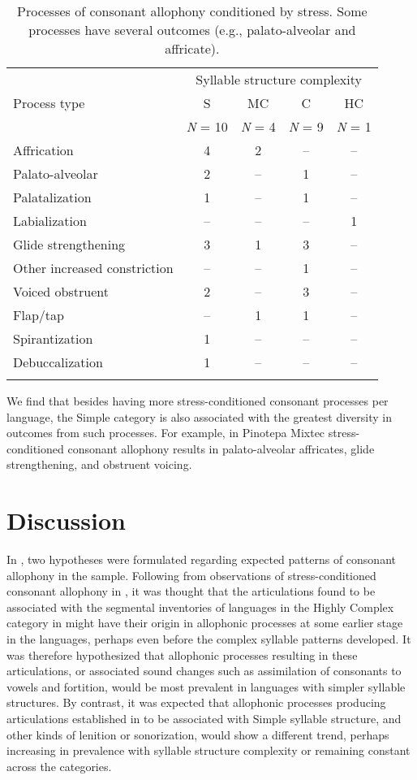 \begin{table}
\begin{tabular}{lcccc}
\lsptoprule
 & \multicolumn{4}{c}{Syllable structure complexity}\\\cmidrule(lr){2-5}
 Process type & S & MC & C & HC\\
             & \textit{N} = 10 & \textit{N} = 4 & \textit{N} = 9 & \textit{N} = 1\\\midrule
 Affrication & 4 & 2 & -- & --\\
 Palato-alveolar & 2 & -- & 1 & --\\
 Palatalization & 1 & -- & 1 & --\\
 Labialization & -- & -- & -- & 1\\
 Glide strengthening & 3 & 1 & 3 & --\\
 Other increased constriction & -- & -- & 1 & --\\
 Voiced obstruent & 2 & -- & 3 & --\\
 Flap/tap & -- & 1 & 1 & --\\
 Spirantization & 1 & -- & -- & --\\
 Debuccalization & 1 & -- & -- & --\\
\lspbottomrule
\end{tabular}
\caption{\label{tab:7.9}Processes of consonant allophony conditioned by stress. Some processes have several outcomes (e.g., palato-alveolar and affricate).}
\end{table}

  We find that besides having more stress-conditioned consonant processes per language, the Simple category is also associated with the greatest diversity in outcomes from such processes. For example, in Pinotepa Mixtec stress-conditioned consonant allophony results in palato-alveolar affricates, glide strengthening, and obstruent voicing.

\section{Discussion}\label{sec:7.4}

  In , two hypotheses were formulated regarding expected patterns of consonant allophony in the sample. Following from observations of stress-conditioned consonant allophony in , it was thought that the articulations found to be associated with the segmental inventories of languages in the Highly Complex category in  might have their origin in allophonic processes at some earlier stage in the languages, perhaps even before the complex syllable patterns developed. It was therefore hypothesized that allophonic processes resulting in these articulations, or associated sound changes such as assimilation of consonants to vowels and fortition, would be most prevalent in languages with simpler syllable structures. By contrast, it was expected that allophonic processes producing articulations established in  to be associated with Simple syllable structure, and other kinds of lenition or sonorization, would show a different trend, perhaps increasing in prevalence with syllable structure complexity or remaining constant across the categories.

